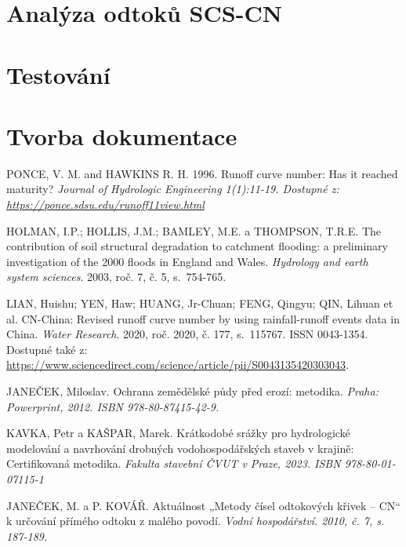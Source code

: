 \documentclass[a4paper,oneside,12pt]{book}
\begin{document}
\section{Analýza odtoků SCS-CN} \label{CN}
\section{Testování} \label{testing}
\section{Tvorba dokumentace} \label{docs}

\clearpage  %
  \label{zdroje}

\begin{thebibliography}{1}
PONCE, V. M. and HAWKINS R. H. 1996. Runoff curve number: Has it reached maturity?
\textit{ Journal of Hydrologic Engineering 1(1):11-19. Dostupné z: \href{https://ponce.sdsu.edu/runoff11view.html}
{https://ponce.sdsu.edu/runoff11view.html}}

HOLMAN, I.P.; HOLLIS, J.M.; BAMLEY, M.E. a THOMPSON, T.R.E. The contribution of soil structural degradation to catchment flooding: a preliminary investigation of the 2000 floods in England and Wales. \textit{Hydrology and earth system sciences}. 2003, roč. 7, č. 5, s.~754-765.

LIAN, Huishu; YEN, Haw; HUANG, Jr-Chuan; FENG, Qingyu; QIN, Lihuan et al. CN-China: Revised runoff curve number by using rainfall-runoff events data in China. \textit{Water Research}. 2020, roč. 2020, č. 177, s.~115767. ISSN 0043-1354. Dostupné také z: \url{https://www.sciencedirect.com/science/article/pii/S0043135420303043}.

JANEČEK, Miloslav. Ochrana zemědělské půdy před erozí: metodika.
\textit{ Praha: Powerprint, 2012. ISBN 978-80-87415-42-9. }

KAVKA, Petr a KAŠPAR, Marek. Krátkodobé srážky pro hydrologické modelování a navrhování drobných vodohospodářských staveb v krajině: Certifikovaná metodika.
\textit{ Fakulta stavební ČVUT v Praze, 2023. ISBN 978-80-01-07115-1}

JANEČEK, M. a P. KOVÁŘ. Aktuálnost „Metody čísel odtokových křivek –
CN“ k určování přímého odtoku z malého povodí.
\textit{ Vodní hospodářství. 2010,
č. 7, s. 187-189.} 


\end{thebibliography}
\end{document}
